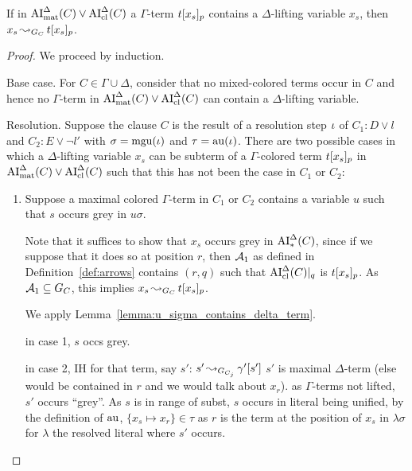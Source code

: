 \documentclass[,%
	draft=false,%
	numbers=noendperiod
	11pt,
	a4paper,
	oneside,%
	openany,
]{memoir}
\begin{document}
\begin{lemma}
	If in $\operatorname{AI}_\mathrm{mat}^\Delta(C) \lor \operatorname{AI}_\mathrm{cl}^\Delta(C)$ a
	$\Gamma$-term $t{[x_s]_{p}}$ contains a $\Delta$-lifting variable $x_s$, then $x_s \operatorname{\leadsto}_{G_C} t{[x_s]_{p}}$.
\end{lemma}
\begin{proof}
	We proceed by induction.

	\begin{description}
		\item{}Base case.
			For $C \in \Gamma\cup\Delta$, consider that no mixed-colored terms occur in $C$ and hence no $\Gamma$-term in $\operatorname{AI}_\mathrm{mat}^\Delta(C) \lor \operatorname{AI}_\mathrm{cl}^\Delta(C)$ can contain a $\Delta$-lifting variable.

		\item{}Resolution.
			Suppose the clause $C$ is the result of a resolution step $\iota$ of $C_1: D \lor l$ and $C_2: E \lor \lnot l'$ with $\sigma = \operatorname{mgu}(\iota)$ and $\tau = \operatorname{au}(\iota)$.
			There are two possible cases in which a $\Delta$-lifting variable $x_s$ can be subterm of a $\Gamma$-colored term $t{[x_s]_{p}}$ in $\operatorname{AI}_\mathrm{mat}^\Delta(C)\lor \operatorname{AI}_\mathrm{cl}^\Delta(C)$ such that this has not been the case in $C_1$ or $C_2$:

			\begin{enumerate}

				\item Suppose a maximal colored $\Gamma$-term in $C_1$ or $C_2$ contains a variable $u$ such that $s$ occurs grey in $u\sigma$.
					\label{25_1}

					Note that it suffices to show that $x_s$ occurs grey in $\operatorname{AI}_\mathrm{*}^\Delta(C)$,
					since if we suppose that it does so at position $r$,
					then $\operatorname{\mathcal{A}}_1$ as defined in Definition~\ref{def:arrows} contains $(r, q)$ such that $\operatorname{AI}_\mathrm{cl}^\Delta(C)|_{q}$ is $t{[x_s]_{p}}$.
					As $\operatorname{\mathcal{A}}_1 \subseteq G_C$, this implies $x_s \operatorname{\leadsto}_{G_C} t{[x_s]_{p}}$.

					We apply Lemma~\ref{lemma:u_sigma_contains_delta_term}.

					in case 1, $s$ occs grey.

					in case 2, IH for that term, say $s'$: $s' \operatorname{\leadsto}_{G_{C_j}} \gamma'[s']$
					$s'$ is maximal $\Delta$-term (else would be contained in $r$ and we would talk about $x_r$).
					as $\Gamma$-terms not lifted, $s'$ occurs ``grey''.
					As $s$ is in range of subst, $s$ occurs in literal being unified,
					by the definition of $\operatorname{au}$, $\{x_s \mapsto x_r\} \in \tau$
					as $r$ is the term at the position of $x_s$ in $\lambda\sigma$ for $\lambda$ the resolved literal where $s'$ occurs.


\end{enumerate}
\end{description}
\end{proof}
\end{document}
